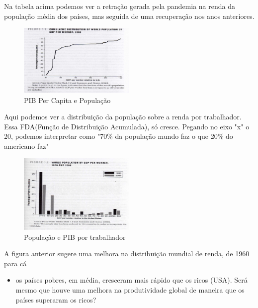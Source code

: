\documentclass[a4paper,12pt]{article}[abntex2]
\begin{document}
Na tabela acima podemos ver a retração gerada pela pandemia na renda da população média dos países, mas seguida de uma recuperação nos anos anteriores.  

\begin{figure}[H]
        \centering
        \caption{PIB Per Capita e População} 
        \includegraphics[width=0.5\textwidth]{Imagens/a1i5.png}
\end{figure}

Aqui podemos ver a distribuição da população sobre a renda por trabalhador. Essa FDA(Função de Distribuição Acumulada), só cresce. Pegando no eixo "x" o 20, podemos interpretar como "70\% da população mundo faz o que 20\% do americano faz"

\begin{figure}[H]
        \centering
        \caption{População e PIB por trabalhador} 
        \includegraphics[width=0.5\textwidth]{Imagens/a1i6.png}
\end{figure}

A figura anterior sugere uma melhora na distribuição mundial de renda, de 1960 para cá \begin{itemize}
    \item os países pobres, em média, cresceram mais rápido que os ricos (USA). Será mesmo que houve uma melhora na produtividade global de maneira que os países superaram os ricos?
\end{itemize} 
\end{document}
